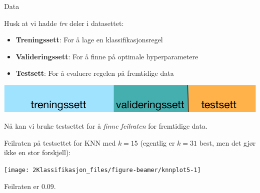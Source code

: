 \documentclass[10pt,ignorenonframetext,]{beamer}
\providecommand{\tightlist}{%
  \setlength{\itemsep}{0pt}\setlength{\parskip}{0pt}}
\begin{document}
\begin{frame}{Data}
\protect\hypertarget{data-1}{}

\vspace{2mm}

Husk at vi hadde \emph{tre} deler i datasettet:

\vspace{2mm}

\begin{itemize}
\tightlist
\item
  \textbf{Treningssett}: For å lage en klassifikasjonsregel
\item
  \textbf{Valideringssett}: For å finne på optimale hyperparametere
\item
  \textbf{Testsett}: For å evaluere regelen på fremtidige data
\end{itemize}

\vspace{5mm}

\includegraphics{datasett.png}

\vspace{2mm}

Nå kan vi bruke testsettet for å \emph{finne feilraten} for fremtidige
data.

\end{frame}

\begin{frame}

Feilraten på testsettet for KNN med \(k=15\) (egentlig er \(k=31\) best,
men det gjør ikke en stor forskjell):

\begin{center}\texttt{[image: 2Klassifikasjon\_files/figure-beamer/knnplot5-1]} \end{center}

Feilraten er 0.09.

\end{frame}
\end{document}
